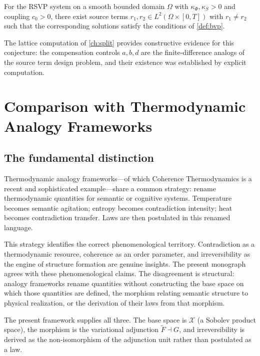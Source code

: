 \documentclass[12pt, oneside]{memoir}
\newcommand{\X}{\mathcal{X}}
\newcommand{\Ft}{\widetilde{F}}
\begin{document}
\begin{conjecture}
\label{conj:pde}
For the RSVP system on a smooth bounded domain $\Omega$ with $\kappa_\Phi, \kappa_S > 0$
and coupling $c_0 > 0$, there exist source terms $r_1, r_2 \in L^2(\Omega \times [0,T])$
with $r_1 \ne r_2$ such that the corresponding solutions satisfy the conditions of
\cref{def:bvp}.
\end{conjecture}

The lattice computation of \cref{ch:split} provides constructive evidence for this
conjecture: the compensation controls $a, b, d$ are the finite-difference analogs of
the source term design problem, and their existence was established by explicit
computation.

\chapter{Comparison with Thermodynamic Analogy Frameworks}
\label{ch:comparison}

\section{The fundamental distinction}

Thermodynamic analogy frameworks---of which Coherence Thermodynamics \cite{barton2025}
is a recent and sophisticated example---share a common strategy: rename thermodynamic
quantities for semantic or cognitive systems.  Temperature becomes semantic agitation;
entropy becomes contradiction intensity; heat becomes contradiction transfer.  Laws are
then postulated in this renamed language.

This strategy identifies the correct phenomenological territory.  Contradiction as a
thermodynamic resource, coherence as an order parameter, and irreversibility as the
engine of structure formation are genuine insights.  The present monograph agrees with
these phenomenological claims.  The disagreement is structural: analogy frameworks
rename quantities without constructing the base space on which those quantities are
defined, the morphism relating semantic structure to physical realization, or the
derivation of their laws from that morphism.

The present framework supplies all three.  The base space is $\X$ (a Sobolev product
space), the morphism is the variational adjunction $\Ft \dashv G$, and irreversibility
is derived as the non-isomorphism of the adjunction unit rather than postulated as a law.
\end{document}
